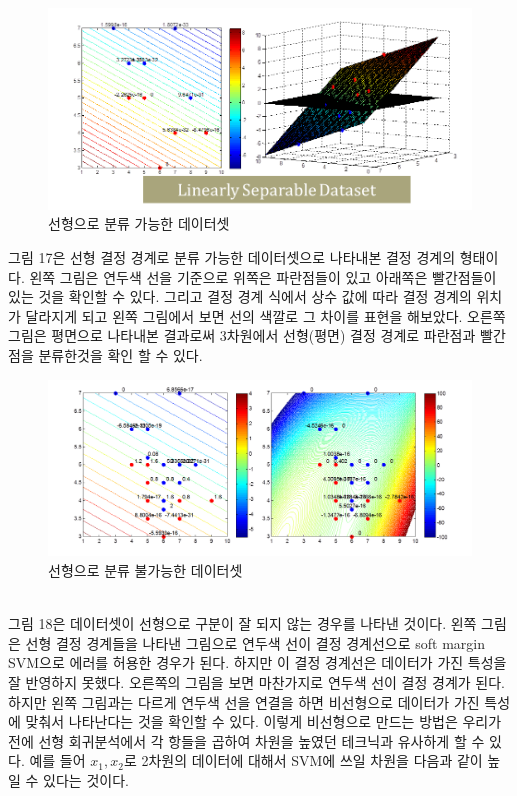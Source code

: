 \documentclass[a4paper]{oblivoir}
\begin{document}
\begin{figure}[ht]\centering
\includegraphics[scale=0.7]{Linear_Dataset}\caption{선형으로 분류 가능한 데이터셋}\label{Fig:5-17}
\end{figure}
\indent 그림 17은 선형 결정 경계로 분류 가능한 데이터셋으로 나타내본 결정 경계의 형태이다. 왼쪽 그림은 연두색 선을 기준으로 위쪽은 파란점들이 있고 아래쪽은 빨간점들이 있는 것을 확인할 수 있다. 그리고 결정 경계 식에서 상수 값에 따라 결정 경계의 위치가 달라지게 되고 왼쪽 그림에서 보면 선의 색깔로 그 차이를 표현을 해보았다. 오른쪽 그림은 평면으로 나타내본 결과로써 3차원에서 선형(평면) 결정 경계로 파란점과 빨간점을 분류한것을 확인 할 수 있다.\\
\begin{figure}[ht]\centering
\includegraphics[scale=0.5]{Linear_Decisionboundary}\caption{선형으로 분류 불가능한 데이터셋}\label{Fig:5-18}
\end{figure}\\
\indent 그림 18은 데이터셋이 선형으로 구분이 잘 되지 않는 경우를 나타낸 것이다. 왼쪽 그림은 선형 결정 경계들을 나타낸 그림으로 연두색 선이 결정 경계선으로 soft margin SVM으로 에러를 허용한 경우가 된다. 하지만 이 결정 경계선은 데이터가 가진 특성을 잘 반영하지 못했다. 오른쪽의 그림을 보면 마찬가지로 연두색 선이 결정 경계가 된다. 하지만 왼쪽 그림과는 다르게 연두색 선을 연결을 하면 비선형으로 데이터가 가진 특성에 맞춰서 나타난다는 것을 확인할 수 있다. 이렇게 비선형으로 만드는 방법은 우리가 전에 선형 회귀분석에서 각 항들을 곱하여 차원을 높였던 테크닉과 유사하게 할 수 있다. 예를 들어 $x_1,x_2$로 2차원의 데이터에 대해서 SVM에 쓰일 차원을 다음과 같이 높일 수 있다는 것이다.
\end{document}
